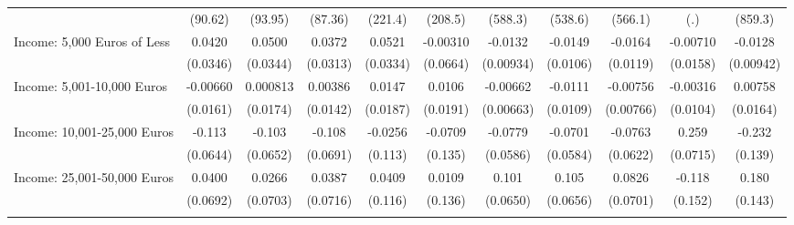 {\begin{tabular}{l*{10}{c}}
            &     (90.62)         &     (93.95)         &     (87.36)         &     (221.4)         &     (208.5)         &     (588.3)         &     (538.6)         &     (566.1)         &         (.)         &     (859.3)         \\
\addlinespace
Income: 5,000 Euros of Less&      0.0420         &      0.0500         &      0.0372         &      0.0521         &    -0.00310         &     -0.0132         &     -0.0149         &     -0.0164         &    -0.00710         &     -0.0128         \\
            &    (0.0346)         &    (0.0344)         &    (0.0313)         &    (0.0334)         &    (0.0664)         &   (0.00934)         &    (0.0106)         &    (0.0119)         &    (0.0158)         &   (0.00942)         \\
\addlinespace
Income: 5,001-10,000 Euros&    -0.00660         &    0.000813         &     0.00386         &      0.0147         &      0.0106         &    -0.00662         &     -0.0111         &    -0.00756         &    -0.00316         &     0.00758         \\
            &    (0.0161)         &    (0.0174)         &    (0.0142)         &    (0.0187)         &    (0.0191)         &   (0.00663)         &    (0.0109)         &   (0.00766)         &    (0.0104)         &    (0.0164)         \\
\addlinespace
Income: 10,001-25,000 Euros&      -0.113         &      -0.103         &      -0.108         &     -0.0256         &     -0.0709         &     -0.0779         &     -0.0701         &     -0.0763         &       0.259\sym{***}&      -0.232         \\
            &    (0.0644)         &    (0.0652)         &    (0.0691)         &     (0.113)         &     (0.135)         &    (0.0586)         &    (0.0584)         &    (0.0622)         &    (0.0715)         &     (0.139)         \\
\addlinespace
Income: 25,001-50,000 Euros&      0.0400         &      0.0266         &      0.0387         &      0.0409         &      0.0109         &       0.101         &       0.105         &      0.0826         &      -0.118         &       0.180         \\
            &    (0.0692)         &    (0.0703)         &    (0.0716)         &     (0.116)         &     (0.136)         &    (0.0650)         &    (0.0656)         &    (0.0701)         &     (0.152)         &     (0.143)         \\
\addlinespace

\end{tabular}}
